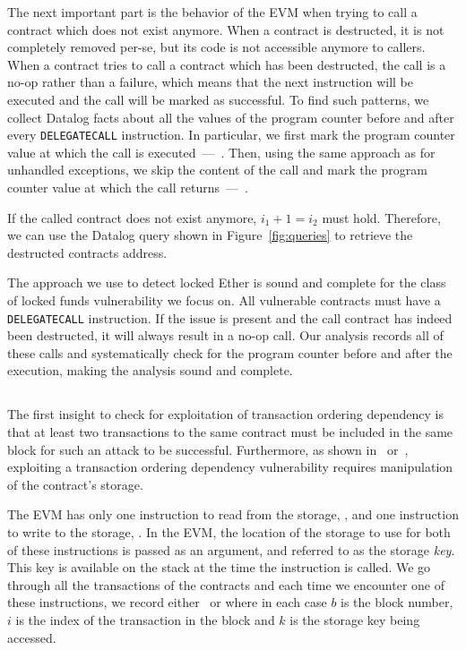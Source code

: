The next important part is the behavior of the EVM when trying to call a contract which does not exist anymore.
When a contract is destructed, it is not completely removed per-se, but its code is not accessible anymore to callers.
When a contract tries to call a contract which has been destructed, the call is a no-op rather than a failure, which means that the next instruction will be executed and the call will be marked as successful.
To find such patterns, we collect Datalog facts about all the values of the program counter before and after every \lstinline{DELEGATECALL} instruction. In particular, we first mark the program counter value at which the call is executed~---~. Then, using the same approach as for unhandled exceptions, we skip the content of the call and mark the program counter value at which the call returns~---~.

If the called contract does not exist anymore, $i_1 + 1 = i_2$ must hold. Therefore, we can use the Datalog query shown in Figure~\ref{fig:queries} to retrieve the destructed contracts address.

\correctness The approach we use to detect locked Ether is sound and complete for the class of locked funds vulnerability we focus on. All vulnerable contracts must have a \lstinline{DELEGATECALL} instruction. If the issue is present and the call contract has indeed been destructed, it will always result in a no-op call. Our analysis records all of these calls and systematically check for the program counter before and after the execution, making the analysis sound and complete.


\subsection{\transactionorder}
The first insight to check for exploitation of transaction ordering dependency is that at least two transactions to the same contract must be included in the same block for such an attack to be successful. Furthermore, as shown in~\cite{Luu2016a} or~\cite{Tsankov2018}, exploiting a transaction ordering dependency vulnerability requires manipulation of the contract's storage.

The EVM has only one instruction to read from the storage, , and one instruction to write to the storage, . In the EVM, the location of the storage to use for both of these instructions is passed as an argument, and referred to as the storage \emph{key}. This key is available on the stack at the time the instruction is called. We go through all the transactions of the contracts and each time we encounter one of these instructions, we record either~ or  where in each case $b$ is the block number, $i$ is the index of the transaction in the block and $k$ is the storage key being accessed.

